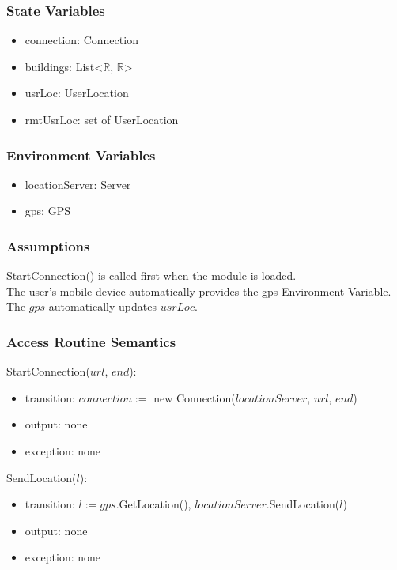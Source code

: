 \documentclass[12pt, titlepage]{article}
\begin{document}
\subsubsection{State Variables}

\begin{itemize}
\item connection: Connection
\item buildings: List\textless\textlangle $\mathbb{R}$, $\mathbb{R}$\textrangle\textgreater 
\item usrLoc: UserLocation
\item rmtUsrLoc: set of UserLocation
\end{itemize}

\subsubsection{Environment Variables}
\begin{itemize}
\item locationServer: Server
\item gps: GPS
\end{itemize}

\subsubsection{Assumptions}

StartConnection() is called first when the module is loaded.\\
The user's mobile device automatically provides the gps Environment Variable.\\
The $gps$ automatically updates $usrLoc$.

\subsubsection{Access Routine Semantics}

\noindent StartConnection($url$, $end$):
\begin{itemize}
\item transition: $connection := $ new Connection($locationServer$, $url$, $end$)
\item output: none
\item exception: none
\end{itemize}

\noindent SendLocation($l$):
\begin{itemize}
\item transition: $l := gps$.GetLocation(), $locationServer$.SendLocation($l$)
\item output: none
\item exception: none
\end{itemize}
\end{document}
